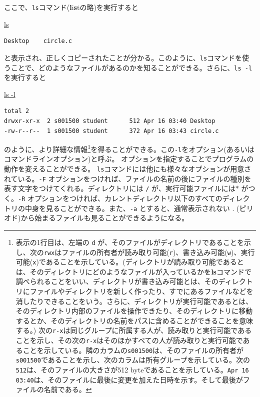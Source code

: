 ここで、\texttt{ls}コマンド(\textbf{l}i\textbf{s}tの略)を実行すると
\begin{commandline2}
    \prompt \underline{ls}
    \begin{verbatim}
Desktop    circle.c
\end{verbatim}
\end{commandline2} \noindent
と表示され、正しくコピーされたことが分かる。このように、\texttt{ls}コマンドを使うことで、どのようなファイルがあるのかを知ることができる。さらに、\texttt{ls -l}を実行すると
\begin{commandline2}
    \prompt \underline{ls -l}
    \vspace*{-.8em}
    \begin{verbatim}
total 2
drwxr-xr-x  2 s001500 student      512 Apr 16 03:40 Desktop
-rw-r--r--  1 s001500 student      372 Apr 16 03:43 circle.c
\end{verbatim}
\end{commandline2} \noindent
のように、より詳細な情報\footnote{表示の1行目は、左端の \texttt{d} が、そのファイルがディレクトリであることを示し、次の\texttt{rwx}はファイルの所有者が読み取り可能(\texttt{r})、書き込み可能(\texttt{w})、実行可能(\texttt{x})であることを示している。(ディレクトリが読み取り可能であるとは、そのディレクトリにどのようなファイルが入っているかを\textbf{ls}コマンドで調べられることをいい、ディレクトリが書き込み可能とは、そのディレクトリにファイルやディレクトリを新しく作ったり、すでにあるファイルなどを消したりできることをいう。さらに、ディレクトリが実行可能であるとは、そのディレクトリ内部のファイルを操作できたり、そのディレクトリに移動するとか、そのディレクトリの名前をパスに含めることができることを意味する。) 次の\texttt{r-x}は同じグループに所属する人が、読み取りと実行可能であることを示し、その次の\texttt{r-x}はそのほかすべての人が読み取りと実行可能であることを示している。隣のカラムの\texttt{s001500}は、そのファイルの所有者が\texttt{s001500}であることを示し、次のカラムは所有グループを示している。次の\texttt{512}は、そのファイルの大きさが512 byteであることを示している。\texttt{Apr 16 03:40}は、そのファイルに最後に変更を加えた日時を示す。そして最後がファイルの名前である。}を得ることができる。この\texttt{-l}をオプション(あるいはコマンドラインオプション)と呼ぶ。
オプションを指定することでプログラムの動作を変えることができる。
\texttt{ls}コマンドには他にも様々なオプションが用意されている。\texttt{-F} オプションをつければ、ファイルの名前の後にファイルの種別を表す文字をつけてくれる。ディレクトリには \texttt{/} が、実行可能ファイルには\texttt{\( \ast\)} がつく。\texttt{-R} オプションをつければ、カレントディレクトリ以下のすべてのディレクトリの中身を見ることができる。また、\texttt{-a} とすると、通常表示されない . (ピリオド)から始まるファイルも見ることができるようになる。

